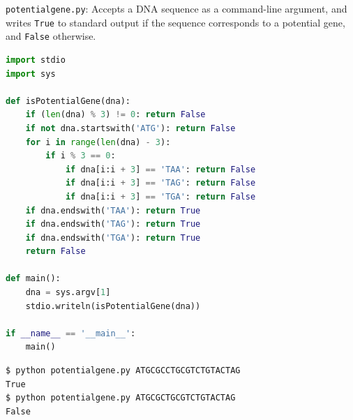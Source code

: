 \documentclass[8pt,a4paper,compress,handout]{beamer}
\begin{document}
\begin{frame}[fragile]
\begin{framed}
\tiny \lstinline{potentialgene.py}: Accepts a DNA sequence as a command-line argument, and writes \lstinline{True} to standard output if the sequence corresponds to a potential gene, and \lstinline{False} otherwise.
\end{framed}

\begin{lstlisting}[language=Python]
import stdio
import sys

def isPotentialGene(dna):
    if (len(dna) % 3) != 0: return False
    if not dna.startswith('ATG'): return False
    for i in range(len(dna) - 3):
        if i % 3 == 0:
            if dna[i:i + 3] == 'TAA': return False
            if dna[i:i + 3] == 'TAG': return False
            if dna[i:i + 3] == 'TGA': return False
    if dna.endswith('TAA'): return True
    if dna.endswith('TAG'): return True
    if dna.endswith('TGA'): return True
    return False

def main():
    dna = sys.argv[1]
    stdio.writeln(isPotentialGene(dna))

if __name__ == '__main__':
    main()
\end{lstlisting}

\begin{lstlisting}[language={}]
$ python potentialgene.py ATGCGCCTGCGTCTGTACTAG
True
$ python potentialgene.py ATGCGCTGCGTCTGTACTAG
False
\end{lstlisting}
\end{frame}
\end{document}
